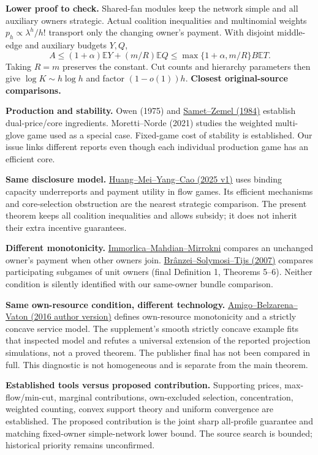 \documentclass[11pt]{article}
\begin{document}
\textbf{Lower proof to check.} Shared-fan modules keep the network simple and
all auxiliary owners strategic. Actual coalition inequalities and multinomial
weights $p_h\propto\lambda^h/h!$ transport only the changing owner's payment.
With disjoint middle-edge and auxiliary budgets $Y,Q$,
\[
 A\le(1+\alpha)\mathbb EY+(m/R)\mathbb EQ
 \le\max\{1+\alpha,m/R\}B\mathbb ET.
\]
Taking $R=m$ preserves the constant. Cut counts and hierarchy parameters
then give $\log K\sim h\log h$ and factor $(1-o(1))h$.
\newpage
\textbf{Closest original-source comparisons.}

\textbf{Production and stability.} Owen (1975) and
\href{https://www.tau.ac.il/~samet/papers/lp\%20games.pdf}{Samet--Zemel (1984)}
establish dual-price/core ingredients. Moretti--Norde (2021) studies the
weighted multi-glove game used as a special case. Fixed-game cost of
stability is established. Our issue links different reports even though
each individual production game has an efficient core.

\textbf{Same disclosure model.}
\href{https://arxiv.org/html/2502.08248v1}{Huang--Mei--Yang--Cao (2025 v1)}
uses binding capacity underreports and payment utility in flow games.
Its efficient mechanisms and core-selection obstruction are the nearest
strategic comparison. The present theorem keeps all coalition inequalities
and allows subsidy; it does not inherit their extra incentive guarantees.

\textbf{Different monotonicity.}
\href{https://immorlica.com/pubs/costshare.pdf}{Immorlica--Mahdian--Mirrokni}
compares an unchanged owner's payment when other owners join.
\href{https://doi.org/10.1007/s11750-007-0002-7}{Br\^anzei--Solymosi--Tijs (2007)}
compares participating subgames of unit owners (final Definition 1,
Theorems 5--6). Neither condition is silently identified with our
same-owner bundle comparison.

\textbf{Same own-resource condition, different technology.}
\href{https://hal.science/hal-01400498v1}{Amigo--Belzarena--Vaton (2016 author version)}
defines own-resource monotonicity and a strictly concave service model.
The supplement's smooth strictly concave example fits that inspected model
and refutes a universal extension of the reported projection simulations,
not a proved theorem. The publisher final has not been compared in full.
This diagnostic is not homogeneous and is separate from the main theorem.

\textbf{Established tools versus proposed contribution.} Supporting prices,
max-flow/min-cut, marginal contributions, own-excluded selection,
concentration, weighted counting, convex support theory and uniform
convergence are established. The proposed contribution is the joint sharp
all-profile guarantee and matching fixed-owner simple-network lower bound.
The source search is bounded; historical priority remains unconfirmed.
\end{document}
